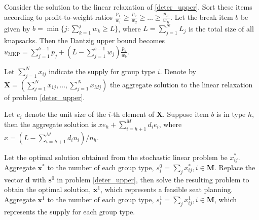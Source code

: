 Consider the solution to the linear relaxation of \eqref{deter_upper}. Sort these items according to profit-to-weight ratios $\frac{p_1}{w_1} \geq \frac{p_2}{w_2} \geq \ldots \geq \frac{p_K}{w_K}$.
Let the break item $b$ be given by $b=\min \{j: \sum_{k=1}^j w_k \geq L\}$, where $L = \sum_{j=1}^{N} L_j$ is the total size of all knapsacks. Then the Dantzig upper bound \cite{dantzig1957discrete} becomes 
$u_{\mathrm{MKP}}=\sum_{j=1}^{b-1} p_j+\left(L-\sum_{j=1}^{b-1} w_j\right) \frac{p_b}{w_b}$. 

Let $\sum_{j=1}^{N} x_{ij}$ indicate the supply for group type $i$. Denote by $\mathbf{X} = (\sum_{j=1}^{N} x_{1j},\ldots, \sum_{j=1}^{N} x_{Mj})$ the aggregate solution to the linear relaxation of problem \eqref{deter_upper}.

\begin{lem}
Let $e_{i}$ denote the unit size of the $i$-th element of $\mathbf{X}$.
Suppose item $b$ is in type $h$, then the aggregate solution is $x e_{h} + \sum_{i=h+1} ^{M} d_{i} e_{i}$, where $x = (L- \sum_{i = h+1}^{M} {d_i n_i})/ n_h$.  
\end{lem}





Let the optimal solution obtained from the stochastic linear problem be $x^{*}_{ij}$. Aggregate $\mathbf{x}^{*}$ to the number of each group type, ${s}_{i}^{0} =\sum_{j} x^{*}_{ij}, i \in \mathbf{M}$. Replace the vector $\mathbf{d}$ with $\mathbf{s}^{0}$ in problem \eqref{deter_upper}, then solve the resulting problem to obtain the optimal solution, $\mathbf{x}^{1}$, which represents a feasible seat planning. Aggregate $\mathbf{x}^{1}$ to the number of each group type, ${s}_{i}^{1} = \sum_{j} x^{1}_{ij}, i \in \mathbf{M}$, which represents the supply for each group type.

